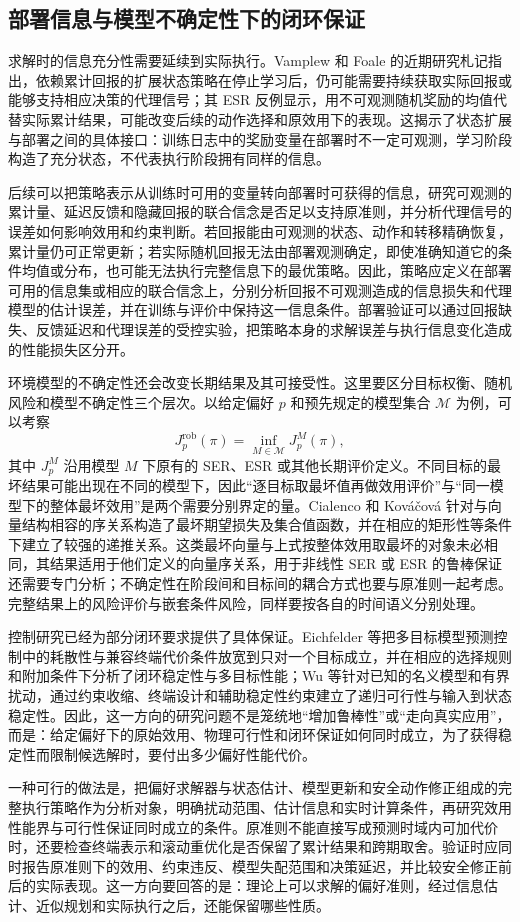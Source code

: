\subsection{部署信息与模型不确定性下的闭环保证}\label{sec:future-deployment}

求解时的信息充分性需要延续到实际执行。Vamplew 和 Foale 的近期研究札记指出，依赖累计回报的扩展状态策略在停止学习后，仍可能需要持续获取实际回报或能够支持相应决策的代理信号；其 ESR 反例显示，用不可观测随机奖励的均值代替实际累计结果，可能改变后续的动作选择和原效用下的表现\cite{vamplew2026deployment}。这揭示了状态扩展与部署之间的具体接口：训练日志中的奖励变量在部署时不一定可观测，学习阶段构造了充分状态，不代表执行阶段拥有同样的信息。

后续可以把策略表示从训练时可用的变量转向部署时可获得的信息，研究可观测的累计量、延迟反馈和隐藏回报的联合信念是否足以支持原准则，并分析代理信号的误差如何影响效用和约束判断。若回报能由可观测的状态、动作和转移精确恢复，累计量仍可正常更新；若实际随机回报无法由部署观测确定，即使准确知道它的条件均值或分布，也可能无法执行完整信息下的最优策略。因此，策略应定义在部署可用的信息集或相应的联合信念上，分别分析回报不可观测造成的信息损失和代理模型的估计误差，并在训练与评价中保持这一信息条件。部署验证可以通过回报缺失、反馈延迟和代理误差的受控实验，把策略本身的求解误差与执行信息变化造成的性能损失区分开。

环境模型的不确定性还会改变长期结果及其可接受性。这里要区分目标权衡、随机风险和模型不确定性三个层次。以给定偏好 $p$ 和预先规定的模型集合 $\mathcal M$ 为例，可以考察
\begin{equation}
J_p^{\mathrm{rob}}(\pi)
=\inf_{M\in\mathcal M}J_p^M(\pi),
\end{equation}
其中 $J_p^M$ 沿用模型 $M$ 下原有的 SER、ESR 或其他长期评价定义。不同目标的最坏结果可能出现在不同的模型下，因此“逐目标取最坏值再做效用评价”与“同一模型下的整体最坏效用”是两个需要分别界定的量。Cialenco 和 Kováčová 针对与向量结构相容的序关系构造了最坏期望损失及集合值函数，并在相应的矩形性等条件下建立了较强的递推关系\cite{cialenco2026robust}。这类最坏向量与上式按整体效用取最坏的对象未必相同，其结果适用于他们定义的向量序关系，用于非线性 SER 或 ESR 的鲁棒保证还需要专门分析；不确定性在阶段间和目标间的耦合方式也要与原准则一起考虑。完整结果上的风险评价与嵌套条件风险，同样要按各自的时间语义分别处理\cite{ruszczynski2010}。

控制研究已经为部分闭环要求提供了具体保证。Eichfelder 等把多目标模型预测控制中的耗散性与兼容终端代价条件放宽到只对一个目标成立，并在相应的选择规则和附加条件下分析了闭环稳定性与多目标性能\cite{eichfelder2023}；Wu 等针对已知的名义模型和有界扰动，通过约束收缩、终端设计和辅助稳定性约束建立了递归可行性与输入到状态稳定性\cite{wu2024}。因此，这一方向的研究问题不是笼统地“增加鲁棒性”或“走向真实应用”，而是：给定偏好下的原始效用、物理可行性和闭环保证如何同时成立，为了获得稳定性而限制候选解时，要付出多少偏好性能代价。

一种可行的做法是，把偏好求解器与状态估计、模型更新和安全动作修正组成的完整执行策略作为分析对象，明确扰动范围、估计信息和实时计算条件，再研究效用性能界与可行性保证同时成立的条件。原准则不能直接写成预测时域内可加代价时，还要检查终端表示和滚动重优化是否保留了累计结果和跨期取舍。验证时应同时报告原准则下的效用、约束违反、模型失配范围和决策延迟，并比较安全修正前后的实际表现。这一方向要回答的是：理论上可以求解的偏好准则，经过信息估计、近似规划和实际执行之后，还能保留哪些性质。
